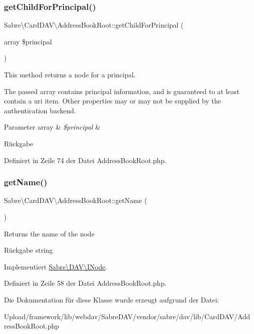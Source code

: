 \subsubsection{\texorpdfstring{get\+Child\+For\+Principal()}{getChildForPrincipal()}}
{\footnotesize\ttfamily Sabre\textbackslash{}\+Card\+D\+A\+V\textbackslash{}\+Address\+Book\+Root\+::get\+Child\+For\+Principal (\begin{DoxyParamCaption}\item[{array}]{\$principal }\end{DoxyParamCaption})}

This method returns a node for a principal.

The passed array contains principal information, and is guaranteed to at least contain a uri item. Other properties may or may not be supplied by the authentication backend.


\begin{DoxyParams}[1]{Parameter}
array & {\em \$principal} & \\
\hline
\end{DoxyParams}
\begin{DoxyReturn}{Rückgabe}

\end{DoxyReturn}


Definiert in Zeile 74 der Datei Address\+Book\+Root.\+php.

\mbox{\label{class_sabre_1_1_card_d_a_v_1_1_address_book_root_a9c3fa2825ad4bc965ae36eb83bf799bd}} 
\subsubsection{\texorpdfstring{get\+Name()}{getName()}}
{\footnotesize\ttfamily Sabre\textbackslash{}\+Card\+D\+A\+V\textbackslash{}\+Address\+Book\+Root\+::get\+Name (\begin{DoxyParamCaption}{ }\end{DoxyParamCaption})}

Returns the name of the node

\begin{DoxyReturn}{Rückgabe}
string 
\end{DoxyReturn}


Implementiert \mbox{\hyperlink{interface_sabre_1_1_d_a_v_1_1_i_node_ab616fe836b1ae36af12126a2bc934dce}{Sabre\textbackslash{}\+D\+A\+V\textbackslash{}\+I\+Node}}.



Definiert in Zeile 58 der Datei Address\+Book\+Root.\+php.



Die Dokumentation für diese Klasse wurde erzeugt aufgrund der Datei\+:\begin{DoxyCompactItemize}
\item 
Upload/framework/lib/webdav/\+Sabre\+D\+A\+V/vendor/sabre/dav/lib/\+Card\+D\+A\+V/Address\+Book\+Root.\+php\end{DoxyCompactItemize}
